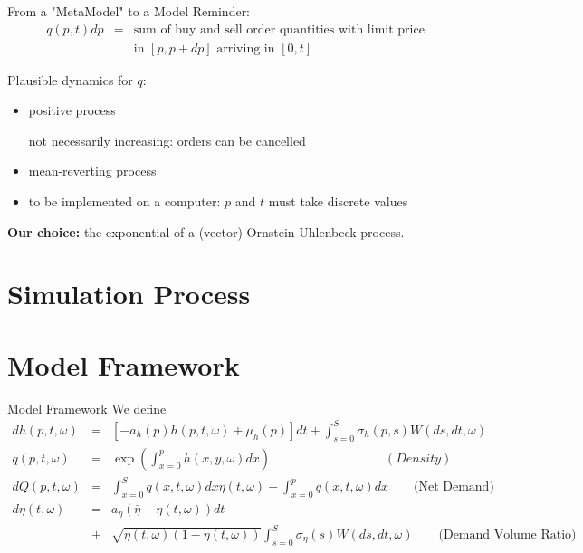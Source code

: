 \documentclass{beamer}
\begin{document}
\begin{frame}[shrink=30]{{\color{cyan}From a "MetaModel" to a Model}}
\bigskip
Reminder:
\begin{eqnarray*}
q(p,t)dp &=&\text{sum of buy and sell order quantities with limit price} \\
&&\text{in }[p,p+dp]\text{ arriving in }[0,t]\text{ }
\end{eqnarray*}

Plausible dynamics for $q$:

\begin{itemize}
\item positive process

\qquad \qquad not necessarily increasing: orders can be cancelled

\item mean-reverting process

\item to be implemented on a computer: $p$ and $t$ must take discrete values

\end{itemize}

{\color{magenta}\textbf{Our choice:}} the exponential of a (vector) Ornstein-Uhlenbeck process.

\end{frame}


\section{Simulation Process}

\section{Model Framework}
\begin{frame}[shrink=30]{{\color{cyan}Model Framework}}
\bigskip
We define
\begin{eqnarray*}
dh(p,t,\omega) &=& [-a_h(p)h(p,t,\omega)+\mu_h (p)]dt + \int_{s=0}^{S}\sigma_h(p,s)W(ds,dt,\omega)  \\
q(p,t,\omega) &=& \exp\left(\int_{x=0}^{p}h(x,y,\omega) dx\right)  \qquad \qquad \qquad \qquad \quad (Density) \\
dQ(p,t,\omega) &=& \int_{x=0}^{S}q(x,t,\omega)dx \eta(t,\omega) - \int_{x=0}^{p}q(x,t,\omega)dx \qquad \textrm{(Net Demand)} \\
d\eta(t,\omega)  &=& a_\eta (\bar{\eta}-\eta(t,\omega))dt  \\
    &+& \sqrt{\eta(t,\omega)(1-\eta(t,\omega))}\int_{s=0}^{S}\sigma_\eta(s) W(ds,dt,\omega)  \qquad \textrm{(Demand Volume Ratio) }
\end{eqnarray*}

\end{frame}
\end{document}
